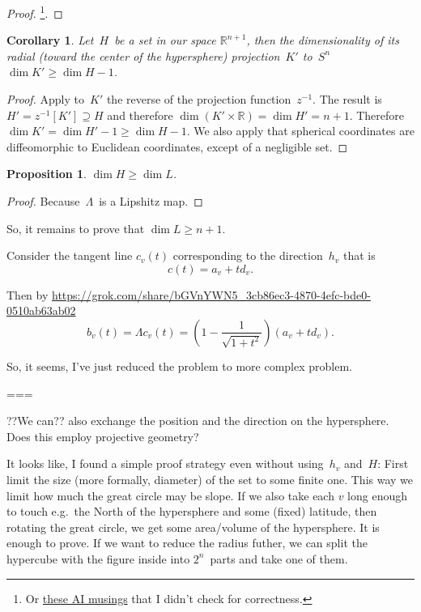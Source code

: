 \documentclass[oneside,draft]{amsart}
\newtheorem{prop}{Proposition}
\newtheorem{cor}{Corollary}
\begin{document}
\begin{proof}
\cite{189275}\footnote{Or \href{https://grok.com/share/bGVnYWN5_2e0aef8b-4309-420f-815c-a09d76ae97c1}{these AI musings}
that I didn't check for correctness.}.
\end{proof}

\begin{cor}
Let~$H$~be a set in our space $\mathbb{R}^{n+1}$, then the dimensionality of its radial (toward the center of the hypersphere) projection~$K'$ to~$S^n$ $\dim K' \geq \dim H - 1$.
\end{cor}

\begin{proof}
Apply to~$K'$ the reverse of the projection function~$z^{-1}$. The result is $H'=z^{-1}[K']\supseteq H$ and therefore $\dim(K'\times\mathbb{R})=\dim H'=n+1$. Therefore $\dim K' = \dim H' - 1 \geq \dim H - 1$.
We also apply that spherical coordinates are diffeomorphic to Euclidean coordinates, except of a negligible set.
\end{proof}

\begin{prop}
$\dim H \geq \dim L$.
\end{prop}

\begin{proof}
Because~$\Lambda$~is a Lipshitz map.
\end{proof}

So, it remains to prove that $\dim L \geq n+1$.

Consider the tangent line $c_v(t)$ corresponding to the direction~$h_v$ that is \[ c(t) = a_v + t d_v. \]

Then by \url{https://grok.com/share/bGVnYWN5_3cb86ec3-4870-4efc-bde0-0510ab63ab02} \[ b_v(t) = \Lambda c_v(t) = \left(1-\frac{1}{\sqrt{1+t^2}}\right)(a_v + t d_v). \]

So, it seems, I've just reduced the problem to more complex problem.

===

??We can?? also exchange the position and the direction on the hypersphere. Does this employ projective geometry?

It looks like, I found a simple proof strategy even without using~$h_v$ and~$H$:
First limit the size (more formally, diameter) of the set to some finite one. This way we limit how much the great circle may be slope. If we also take each $v$ long enough to touch e.g.\ the North of the hypersphere and some (fixed) latitude, then rotating the great circle, we get some area/volume of the hypersphere. It is enough to prove.
If we want to reduce the radius futher, we can split the hypercube with the figure inside into $2^n$~parts and take one of them.
\end{document}
